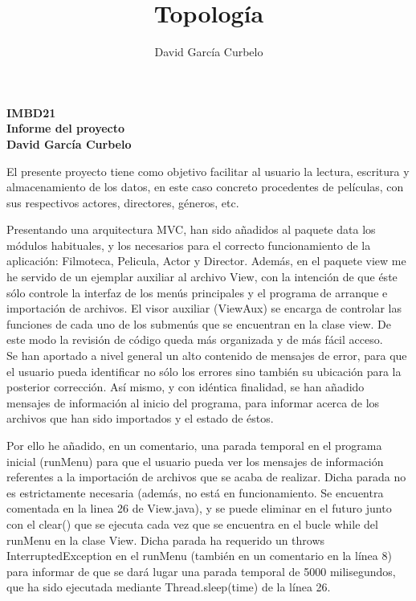 \documentclass[fleqn]{article}
\author{David García Curbelo}
\title{Topología}
\begin{document}
    \doublespace

    \setcounter{page}{1}
    \pagestyle{plain}

    \begin{center}
        {\Large\bf{IMBD21}} \\
        {\large\bf{Informe del proyecto}} \\
        \bf{David García Curbelo}\\
        
    \end{center}

    El presente proyecto tiene como objetivo facilitar al usuario la lectura, escritura y almacenamiento de los datos,
    en este caso concreto procedentes de películas, con sus respectivos actores, directores, géneros, etc.

    Presentando una arquitectura MVC, han sido añadidos al paquete data los módulos habituales, y los necesarios para 
    el correcto funcionamiento de la aplicación: Filmoteca, Pelicula, Actor y Director. Además, en el paquete view me he servido 
    de un ejemplar auxiliar al archivo View, con la intención de que éste sólo controle la interfaz de los menús principales
    y el programa de arranque e importación de archivos. El visor auxiliar (ViewAux) se encarga de controlar las funciones de cada 
    uno de los submenús que se encuentran en la clase view. De este modo la revisión de código queda más organizada y de más fácil acceso.\\
    
    Se han aportado a nivel general un alto contenido de mensajes de error, para que el usuario pueda identificar no sólo los errores sino 
    también su ubicación para la posterior corrección. Así mismo, y con idéntica finalidad, se han añadido mensajes de información al inicio del programa,
    para informar acerca de los archivos que han sido importados y el estado de éstos. 
    
    Por ello he añadido, en un comentario, una parada temporal en el programa inicial (runMenu) para que el usuario pueda ver los mensajes de información 
    referentes a la importación de archivos que se acaba de realizar.
    Dicha parada no es estrictamente necesaria (además, no está en funcionamiento. Se encuentra comentada en la linea 26 de View.java), 
    y se puede eliminar en el futuro junto con el clear() que se ejecuta cada vez que se encuentra 
    en el bucle while del runMenu en la clase View. Dicha parada ha requerido un throws InterruptedException en el runMenu (también en un comentario en la línea
    8) para informar de que se dará lugar una parada temporal de 5000 milisegundos, que ha sido ejecutada mediante Thread.sleep(time) de la línea 26.
\end{document}
